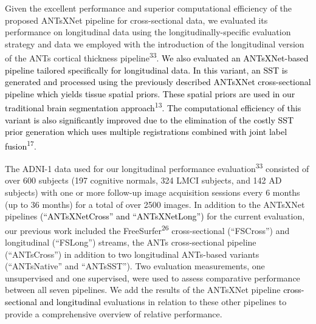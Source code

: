 \documentclass[12pt,]{article}
\begin{document}
Given the excellent performance and superior computational efficiency of
the proposed ANTsXNet pipeline for cross-sectional data, we evaluated
its performance on longitudinal data using the longitudinally-specific
evaluation strategy and data we employed with the introduction of the
longitudinal version of the ANTs cortical thickness
pipeline\textsuperscript{33}. \textcolor{black}{
We also evaluated an ANTsXNet-based pipeline tailored specifically for longitudinal
data.  In this variant, an SST is generated and processed using the previously
described ANTsXNet cross-sectional pipeline which yields tissue spatial priors.
These spatial priors are used in our traditional brain segmentation approach}\textsuperscript{13}\textcolor{black}{.  The computational efficiency of this variant is also
significantly improved due to the elimination of the costly SST prior generation
which uses multiple registrations combined with joint label fusion}\textsuperscript{17}.

The ADNI-1 data used for our longitudinal performance
evaluation\textsuperscript{33} consisted of over 600 subjects (197
cognitive normals, 324 LMCI subjects, and 142 AD subjects) with one or
more follow-up image acquisition sessions every 6 months (up to 36
months) for a total of over 2500 images. In addition to the ANTsXNet
pipelines \textcolor{black}{(``ANTsXNetCross'' and
``ANTsXNetLong'')} for the current evaluation, our previous work
included the FreeSurfer\textsuperscript{26} cross-sectional
(``FSCross'') and longitudinal (``FSLong'') streams, the ANTs
cross-sectional pipeline (``ANTsCross'') in addition to two longitudinal
ANTs-based variants (``ANTsNative'' and ``ANTsSST''). Two evaluation
measurements, one unsupervised and one supervised, were used to assess
comparative performance between all seven pipelines. We add the results
of the ANTsXNet pipeline
\textcolor{black}{cross-sectional and longitudinal} evaluations in
relation to these other pipelines to provide a comprehensive overview of
relative performance.
\end{document}
